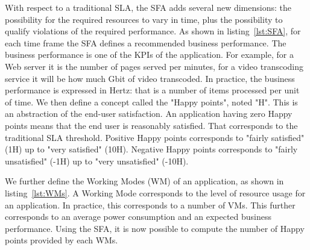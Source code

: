 
With respect to a traditional SLA, the SFA adds several new dimensions: the possibility for the required resources to vary in time, plus the possibility to qualify violations of the required performance.
As shown in listing~\ref{lst:SFA}, for each time frame the SFA defines a recommended business performance. 
The business performance is one of the KPIs of the application.
For example, for a Web server it is the number of pages served per minutes, for a video transcoding service it will be how much Gbit of video transcoded.
In practice, the business performance is expressed in Hertz: that is a number of items processed per unit of time.
We then define a concept called the "Happy points", noted "H".
This is an abstraction of the end-user satisfaction.
An application having zero Happy points means that the end user is reasonably satisfied.
That corresponds to the traditional SLA threshold.
Positive Happy points corresponds to "fairly satisfied" (1H) up to "very satisfied" (10H).
Negative Happy points corresponds to "fairly unsatisfied" (-1H) up to "very unsatisfied" (-10H).

We further define the Working Modes (WM) of an application, as shown in listing~\ref{lst:WMs}.
A Working Mode corresponds to the level of resource usage for an application.
In practice, this corresponds to a number of VMs.
This further corresponds to an average power consumption and an expected business performance. 
Using the SFA, it is now possible to compute the number of Happy points provided by each WMs.



